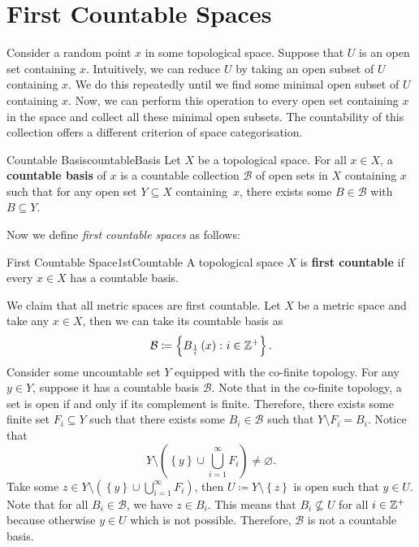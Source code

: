 \documentclass[math]{amznotes}
\theoremstyle{remark}
\begin{document}
\section{First Countable Spaces}
Consider a random point $x$ in some topological space. Suppose that $U$ is an open set containing $x$. Intuitively, we can reduce $U$ by taking an open subset of $U$ containing $x$. We do this repeatedly until we find some minimal open subset of $U$ containing $x$. Now, we can perform this operation to every open set containing $x$ in the space and collect all these minimal open subsets. The countability of this collection offers a different criterion of space categorisation.
\begin{dfnbox}{Countable Basis}{countableBasis}
    Let $X$ be a topological space. For all $x \in X$, a {\color{red} \textbf{countable basis}} of $x$ is a countable collection $\mathcal{B}$ of open sets in $X$ containing $x$ such that for any open set $Y \subseteq X$ containing~$x$, there exists some $B \in \mathcal{B}$ with $B \subseteq Y$. 
\end{dfnbox}
Now we define \textit{first countable spaces} as follows:
\begin{dfnbox}{First Countable Space}{1stCountable}
    A topological space $X$ is {\color{red} \textbf{first countable}} if every $x \in X$ has a countable basis.
\end{dfnbox}
We claim that all metric spaces are first countable. Let $X$ be a metric space and take any $x \in X$, then we can take its countable basis as 
\begin{equation*}
    \mathcal{B} \coloneqq \left\{B_{\frac{1}{i}}\left(x\right) \colon i \in \mathbb{Z}^+\right\}.
\end{equation*}
Consider some uncountable set $Y$ equipped with the co-finite topology. For any $y \in Y$, suppose it has a countable basis $\mathcal{B}$. Note that in the co-finite topology, a set is open if and only if its complement is finite. Therefore, there exists some finite set $F_i \subseteq Y$ such that there exists some $B_i \in \mathcal{B}$ such that $Y \setminus F_i = B_i$. Notice that 
\begin{equation*}
    Y \setminus \left(\left\{y\right\} \cup \bigcup_{i = 1}^{\infty}F_i\right) \neq \varnothing.
\end{equation*}
Take some $z \in Y \setminus \left(\left\{y\right\} \cup \bigcup_{i = 1}^{\infty}F_i\right)$, then $U \coloneqq Y \setminus \left\{z\right\}$ is open such that $y \in U$. Note that for all $B_i \in \mathcal{B}$, we have $z \in B_i$. This means that $B_i \not\subseteq U$ for all $i \in \mathbb{Z}^+$ because otherwise $y \in U$ which is not possible. Therefore, $\mathcal{B}$ is not a countable basis.
\end{document}
